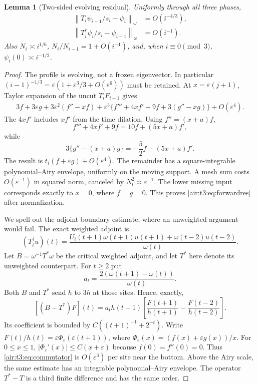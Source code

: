 \documentclass[11pt,letterpaper]{article}
\numberwithin{equation}{section}
\newtheorem{lemma}[theorem]{Lemma}
\theoremstyle{remark}
\newcommand{\norm}[1]{\left\lVert#1\right\rVert}
\newcommand{\eps}{\varepsilon}
\begin{document}
\begin{lemma}[Two-sided evolving residual]\label{air:t3:lem:residual}
Uniformly through all three phases,
\begin{align}
\norm{T_i\psi_{i-1}/s_i-\psi_i}_\omega&=O(i^{-4/3}),\label{air:t3:eq:forwardres}\\
\norm{T_i^\dagger\psi_i/s_i-\psi_{i-1}}_\omega&=O(i^{-1}).\label{air:t3:eq:adjres}
\end{align}
Also $N_i\asymp i^{1/6}$, $N_i/N_{i-1}=1+O(i^{-1})$, and, when $i\equiv0\pmod3$, $\psi_i(0)\asymp i^{-1/2}$.
\end{lemma}
\begin{proof}
The profile is evolving, not a frozen eigenvector. In particular
$(i-1)^{-1/3}=\eps(1+\eps^3/3+O(\eps^6))$ must be retained.
At $x=\eps(j+1)$, Taylor expansion of the uncut $T_iF_{i-1}$ gives
\begin{align*}
3f+3\eps g+3\eps^2(f''-xf)
+\eps^3\{f'''+4xf'+9f+3(g''-xg)\}+O(\eps^4).
\end{align*}
The $4xf'$ includes $xf'$ from the time dilation. Using $f''=(x+a)f$,
\[
f'''+4xf'+9f=10f+(5x+a)f',
\]
while
\[
3\{g''-(x+a)g\}=-\frac52f-(5x+a)f'.
\]
The result is $t_i(f+\eps g)+O(\eps^4)$. The remainder has a square-integrable polynomial--Airy envelope, uniformly on the moving support. A mesh sum costs $O(\eps^{-1})$ in squared norm, canceled by $N_i^2\asymp\eps^{-1}$. The lower missing input corresponds exactly to $x=0$, where $f=g=0$. This proves \eqref{air:t3:eq:forwardres} after normalization.

We spell out the adjoint boundary estimate, where an unweighted argument would fail. The exact weighted adjoint is
\[
(T_i^\dagger u)(t)=
\frac{U_i(t+1)\omega(t+1)u(t+1)+\omega(t-2)u(t-2)}{\omega(t)}.
\]
Let $B=\omega^{-1}T^*\omega$ be the critical weighted adjoint, and let $T^*$ here denote its unweighted counterpart. For $t\ge2$ put
\[
a_t=\frac{2(\omega(t+1)-\omega(t))}{\omega(t)}.
\]
Both $B$ and $T^*$ send $h$ to $3h$ at those sites. Hence, exactly,
\begin{equation}\label{air:t3:eq:commutator}
[(B-T^*)F](t)=a_t h(t+1)
\left[\frac{F(t+1)}{h(t+1)}-\frac{F(t-2)}{h(t-2)}\right].
\end{equation}
Its coefficient is bounded by $C((t+1)^{-1}+2^{-t})$. Write
$F(t)/h(t)=\eps\Phi_\eps(\eps(t+1))$, where
$\Phi_\eps(x)=(f(x)+\eps g(x))/x$.
For $0\le x\le1$,
$|\Phi_\eps'(x)|\le C(x+\eps)$ because $f(0)=f''(0)=0$.
Thus \eqref{air:t3:eq:commutator} is $O(\eps^3)$ per site near the bottom. Above the Airy scale, the same estimate has an integrable polynomial--Airy envelope. The operator $T^*-T$ is a third finite difference and has the same order.


\end{proof}
\end{document}
